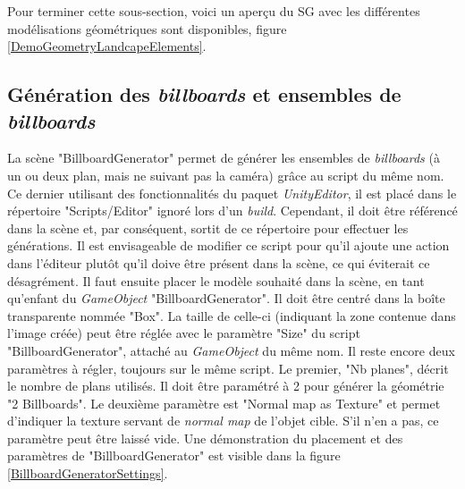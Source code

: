 		Pour terminer cette sous-section, voici un aperçu du SG avec les différentes modélisations géométriques sont disponibles, figure \ref{DemoGeometryLandcapeElements}.\medskip		
		
		\begin{minipage}{\linewidth}
			\label{DemoGeometryLandcapeElements}
		\end{minipage}\medskip %

	\subsection*{Génération des \textit{billboards} et ensembles de \textit{billboards}}
		La scène "BillboardGenerator" permet de générer les ensembles de \textit{billboards} (à un ou deux plan, mais ne suivant pas la caméra) grâce au script du même nom. Ce dernier utilisant des fonctionnalités du paquet \textit{UnityEditor}, il est placé dans le répertoire "Scripts/Editor" ignoré lors d'un \textit{build}. Cependant, il doit être référencé dans la scène et, par conséquent, sortit de ce répertoire pour effectuer les générations. Il est envisageable de modifier ce script pour qu'il ajoute une action dans l'éditeur plutôt qu'il doive être présent dans la scène, ce qui éviterait ce désagrément. Il faut ensuite placer le modèle souhaité dans la scène, en tant qu'enfant du \textit{GameObject} "BillboardGenerator". Il doit être centré dans la boîte transparente nommée "Box". La taille de celle-ci (indiquant la zone contenue dans l'image créée) peut être réglée avec le paramètre "Size" du script "BillboardGenerator", attaché au \textit{GameObject} du même nom. Il reste encore deux paramètres à régler, toujours sur le même script. Le premier, "Nb planes", décrit le nombre de plans utilisés. Il doit être paramétré à 2 pour générer la géométrie "2 Billboards". Le deuxième paramètre est "Normal map as Texture" et permet d'indiquer la texture servant de \textit{normal map} \cite{UnityNormalMap} de l'objet cible. S'il n'en a pas, ce paramètre peut être laissé vide.
		Une démonstration du placement et des paramètres de "BillboardGenerator" est visible dans la figure \ref{BillboardGeneratorSettings}.\medskip		
		
